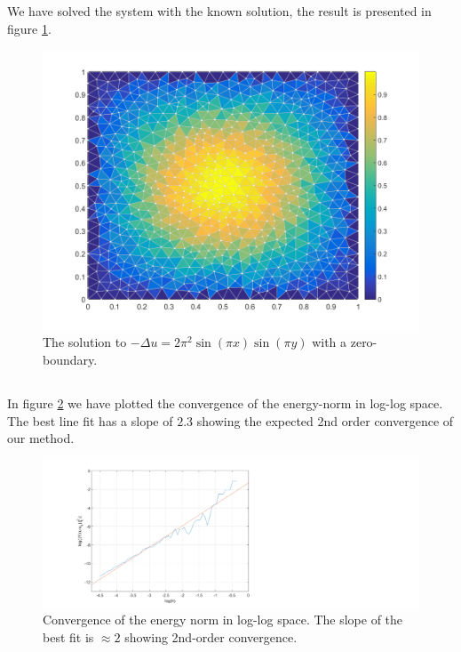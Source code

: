 \subsection{}
We have solved the system with the known solution, the result is presented in figure \ref{fig:3a}.
\begin{figure}[!Hh]
  \centering
  \includegraphics[width=\textwidth]{./plots/problem_03_result}
  \caption{The solution to $-\Delta u = 2\pi^2\sin(\pi x)\sin(\pi y)$ with a zero-boundary.}
  \label{fig:3a}
\end{figure}
\subsection{}
In figure \ref{fig:3b} we have plotted the convergence of the energy-norm in log-log space. The best line fit has a slope of $2.3$ showing the expected 2nd order convergence of our method.
\begin{figure}[!Hh]
  \centering
  \includegraphics[width=1.5\textwidth]{./plots/problem_03_convergence}
  \caption{Convergence of the energy norm in log-log space. The slope of the best fit is $\approx 2$ showing 2nd-order convergence.}
  \label{fig:3b}
\end{figure}

